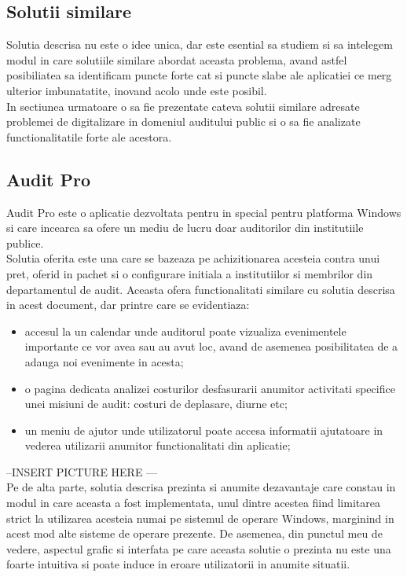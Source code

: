 	\subsection{Solutii similare}
	Solutia descrisa nu este o idee unica, dar este esential sa studiem si sa intelegem modul in care solutiile similare abordat aceasta problema, avand astfel posibiliatea sa identificam puncte forte cat si puncte slabe ale aplicatiei ce merg ulterior imbunatatite, inovand acolo unde este posibil.\\
	In sectiunea urmatoare o sa fie prezentate cateva solutii similare adresate problemei de digitalizare in domeniul auditului public si o sa fie analizate functionalitatile forte ale acestora. 
	
	\subsection*{Audit Pro}
	
	Audit Pro este o aplicatie dezvoltata pentru in special pentru platforma Windows si care incearca sa ofere un mediu de lucru doar auditorilor din institutiile publice.\\
	Solutia oferita este una care se bazeaza pe achizitionarea acesteia contra unui pret, oferid in pachet si o configurare initiala a institutiilor si membrilor din departamentul de audit.
	Aceasta ofera functionalitati similare cu solutia descrisa in acest document, dar printre care se evidentiaza: 
	\begin{itemize}
		\item accesul la un calendar unde auditorul poate vizualiza evenimentele importante ce vor avea sau au avut loc, avand de asemenea posibilitatea de a adauga noi evenimente in acesta;
		
		\item o pagina dedicata analizei costurilor desfasurarii anumitor activitati specifice unei misiuni de audit: costuri de deplasare, diurne etc;
		
		\item un meniu de ajutor unde utilizatorul poate accesa informatii ajutatoare in vederea utilizarii anumitor functionalitati din aplicatie;
		
	\end{itemize}
--INSERT PICTURE HERE --- \\ 
Pe de alta parte, solutia descrisa prezinta si anumite dezavantaje care constau in modul in care aceasta a fost implementata, unul dintre acestea fiind limitarea strict la utilizarea acesteia numai pe sistemul de operare Windows, marginind in acest mod alte sisteme de operare prezente.
De asemenea, din punctul meu de vedere, aspectul grafic si interfata pe care aceasta solutie o prezinta nu este una foarte intuitiva si poate induce in eroare utilizatorii in anumite situatii.\\

